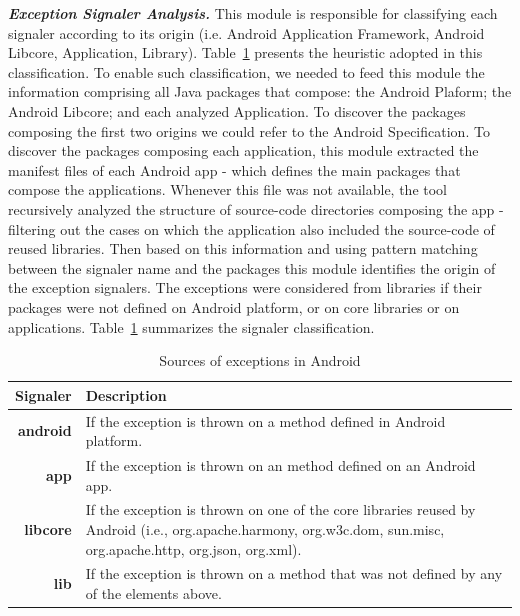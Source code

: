 \documentclass[conference]{IEEEtran}
\begin{document}
\emph{\textbf{Exception Signaler Analysis.}}
This module is responsible for classifying each signaler according 
to its origin (i.e. Android Application Framework, Android Libcore, Application, Library). 
Table~\ref{tab:signalers} presents the heuristic adopted in this classification.
To enable such classification, we needed to feed this module the information
comprising all Java packages that compose: the Android Plaform;
 the Android Libcore; and each analyzed Application. 
To discover the packages composing the first two origins
we could refer to the Android Specification.
To discover the packages composing each application, this module 
extracted the manifest files of each Android app
 - which defines the main packages that compose the applications.
 Whenever this file was not available, the tool recursively analyzed the 
structure of source-code directories composing the app
- filtering out the cases on which the application 
also included the source-code of reused libraries.
Then based on this information and using pattern matching 
between the signaler name and the packages this module identifies 
the origin of the exception signalers. The exceptions were considered
 from libraries if their packages were not defined 
on Android platform, or on core libraries or on applications.
Table~\ref{tab:signalers} summarizes the signaler classification.


\begin{table}
  \centering
  \begin{tabular}{rp{29em}}
    \hline
    \bfseries{Signaler} & \bfseries{Description} \\
    \hline
    \bfseries{android} & If the exception is thrown on a method defined in Android platform.\\
    \bfseries{app}     & If the exception is thrown on an method defined on an Android app.\\
    \bfseries{libcore} & If the exception is thrown on one of the core libraries reused by Android (i.e., org.apache.harmony, org.w3c.dom, sun.misc, org.apache.http, org.json, org.xml). \\
    \bfseries{lib}     & If the exception is thrown on a method that was not defined by any of the elements above.\\
    \hline
  \end{tabular}
  \caption{Sources of exceptions in Android}
  \label{tab:signalers}
\end{table}
\end{document}
